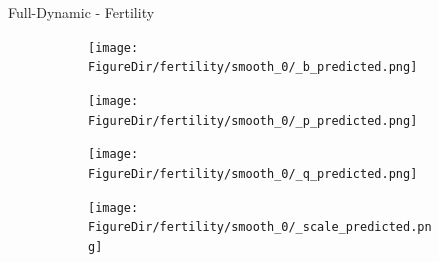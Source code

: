 \documentclass[12pt]{beamer}
\newcommand*{\FigureDir}{../graphs}
\begin{document}
\begin{frame}{Full-Dynamic - Fertility}
\begin{table}[H]
\begin{minipage}[t]{0.33\textwidth}
\begin{figure}[H]
			\begin{subfigure}{\textwidth}
				\centering
				\texttt{[image: \\FigureDir/fertility/smooth\_0/\_b\_predicted.png]}
				\vspace{-3mm}
				\\ 
			\end{subfigure}
		\end{figure}
	\end{minipage}%
	\begin{minipage}[t]{0.33\textwidth}
		\begin{figure}[H]
			\vspace{10mm}
			\begin{subfigure}{\textwidth}
				\centering
				\texttt{[image: \\FigureDir/fertility/smooth\_0/\_p\_predicted.png]}
				\\ 
			\end{subfigure}
		\end{figure}
	\end{minipage}%
	\begin{minipage}[t]{0.33\textwidth}
		\begin{figure}[H]
			\begin{subfigure}{\textwidth}
				\centering
				\texttt{[image: \\FigureDir/fertility/smooth\_0/\_q\_predicted.png]}
				\vspace{-3mm}
				\\ 
			\end{subfigure}

			\begin{subfigure}{\textwidth}
				\centering
				\texttt{[image: \\FigureDir/fertility/smooth\_0/\_scale\_predicted.png]}
				\vspace{-3mm}
				\\ 
			\end{subfigure}
		\end{figure}
	\end{minipage}
	\end{table}

\end{frame}
\end{document}
